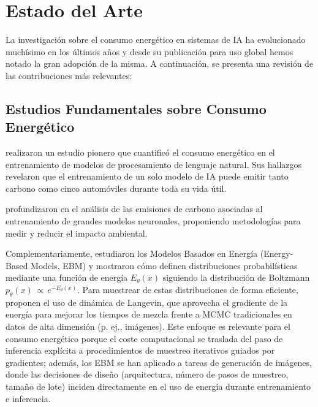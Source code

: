 \section{Estado del Arte}

La investigación sobre el consumo energético en sistemas de IA ha evolucionado muchísimo en los últimos años y desde su publicación para uso global hemos notado la gran adopción de la misma. A continuación, se presenta una revisión de las contribuciones más relevantes:

\subsection{Estudios Fundamentales sobre Consumo Energético}

\textcite{strubell2019energy} realizaron un estudio pionero que cuantificó el consumo energético en el entrenamiento de modelos de procesamiento de lenguaje natural. Sus hallazgos revelaron que el entrenamiento de un solo modelo de IA puede emitir tanto carbono como cinco automóviles durante toda su vida útil.

\textcite{patterson2021carbon} profundizaron en el análisis de las emisiones de carbono asociadas al entrenamiento de grandes modelos neuronales, proponiendo metodologías para medir y reducir el impacto ambiental.

Complementariamente, \textcite{du2019implicit} estudiaron los Modelos Basados en Energía (Energy-Based Models, EBM) y mostraron cómo definen distribuciones probabilísticas mediante una función de energía $E_\theta(x)$ siguiendo la distribución de Boltzmann $p_\theta(x) \,{\propto}\, e^{-E_\theta(x)}$. Para muestrear de estas distribuciones de forma eficiente, proponen el uso de dinámica de Langevin, que aprovecha el gradiente de la energía para mejorar los tiempos de mezcla frente a MCMC tradicionales en datos de alta dimensión (p. ej., imágenes). Este enfoque es relevante para el consumo energético porque el coste computacional se traslada del paso de inferencia explícita a procedimientos de muestreo iterativos guiados por gradientes; además, los EBM se han aplicado a tareas de generación de imágenes, donde las decisiones de diseño (arquitectura, número de pasos de muestreo, tamaño de lote) inciden directamente en el uso de energía durante entrenamiento e inferencia.


